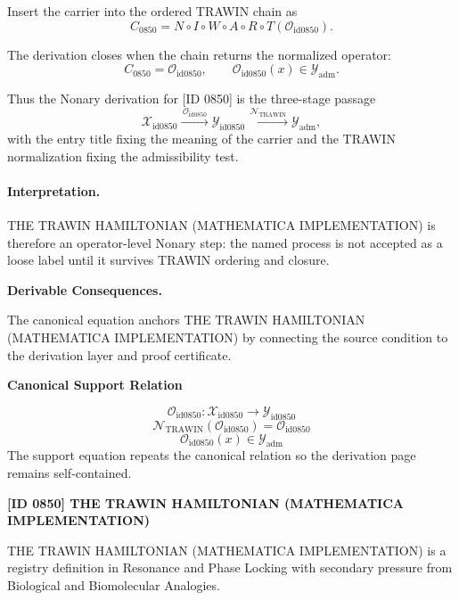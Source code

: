 Insert the carrier into the ordered TRAWIN chain as\[
C_{0850}=N\circ I\circ W\circ A\circ R\circ T(\mathcal{O}_{\mathrm{id0850}}).
\]

The derivation closes when the chain returns the normalized operator:\[
C_{0850}=\mathcal{O}_{\mathrm{id0850}},\qquad \mathcal{O}_{\mathrm{id0850}}(x)\in\mathcal{Y}_{\mathrm{adm}}.
\]

Thus the Nonary derivation for [ID 0850] is the three-stage passage
\[
\mathcal{X}_{\mathrm{id0850}}\xrightarrow{\,\mathcal{O}_{\mathrm{id0850}}\,} \mathcal{Y}_{\mathrm{id0850}}\xrightarrow{\,\mathcal{N}_{\mathrm{TRAWIN}}\,} \mathcal{Y}_{\mathrm{adm}},
\]
with the entry title fixing the meaning of the carrier and the TRAWIN normalization fixing the admissibility test.

\paragraph{Interpretation.} THE TRAWIN HAMILTONIAN (MATHEMATICA IMPLEMENTATION) is therefore an operator-level Nonary step: the named process is not accepted as a loose label until it survives TRAWIN ordering and closure.

\par\vspace{0.35em}
\noindent\textbf{Derivable Consequences.}\quad
\begingroup
\footnotesize
\raggedright
The canonical equation anchors THE TRAWIN HAMILTONIAN (MATHEMATICA IMPLEMENTATION) by connecting the source condition to the derivation layer and proof certificate.
\par\endgroup

\noindent\textbf{Canonical Support Relation}\par
\[
\mathcal{O}_{\mathrm{id0850}}:\mathcal{X}_{\mathrm{id0850}}\longrightarrow\mathcal{Y}_{\mathrm{id0850}}
\]
\[
\mathcal{N}_{\mathrm{TRAWIN}}(\mathcal{O}_{\mathrm{id0850}})=\mathcal{O}_{\mathrm{id0850}}
\]
\[
\mathcal{O}_{\mathrm{id0850}}(x)\in\mathcal{Y}_{\mathrm{adm}}
\]
\noindent The support equation repeats the canonical relation so the derivation page remains self-contained.\par

\clearpage
\noindent\textbf{[ID 0850] THE TRAWIN HAMILTONIAN (MATHEMATICA IMPLEMENTATION)}\par
\vspace{0.35em}
\begingroup\small
{}
THE TRAWIN HAMILTONIAN (MATHEMATICA IMPLEMENTATION) is a registry definition in Resonance and Phase Locking with secondary pressure from Biological and Biomolecular Analogies.

